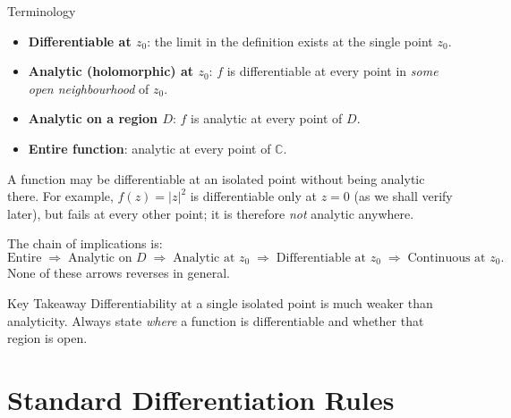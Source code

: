 \documentclass[12pt,a4paper]{article}
\begin{document}
\begin{infobox}{Terminology}
\begin{itemize}[leftmargin=1.5em]
  \item \textbf{Differentiable at $z_0$}: the limit in the definition exists at the
        single point $z_0$.
  \item \textbf{Analytic (holomorphic) at $z_0$}: $f$ is differentiable at every point
        in \emph{some open neighbourhood} of $z_0$.
  \item \textbf{Analytic on a region $D$}: $f$ is analytic at every point of $D$.
  \item \textbf{Entire function}: analytic at every point of $\mathbb{C}$.
\end{itemize}
\end{infobox}

A function may be differentiable at an isolated point without being analytic there.
For example, $f(z) = |z|^2$ is differentiable only at $z = 0$ (as we shall verify
later), but fails at every other point; it is therefore \emph{not} analytic anywhere.

\medskip
The chain of implications is:
\[
  \text{Entire} \;\Rightarrow\; \text{Analytic on } D
  \;\Rightarrow\; \text{Analytic at } z_0
  \;\Rightarrow\; \text{Differentiable at } z_0
  \;\Rightarrow\; \text{Continuous at } z_0.
\]
None of these arrows reverses in general.

\begin{learnbox}{Key Takeaway}
Differentiability at a single isolated point is much weaker than analyticity.
Always state \emph{where} a function is differentiable and whether that region is open.
\end{learnbox}

\section{Standard Differentiation Rules}
\end{document}
